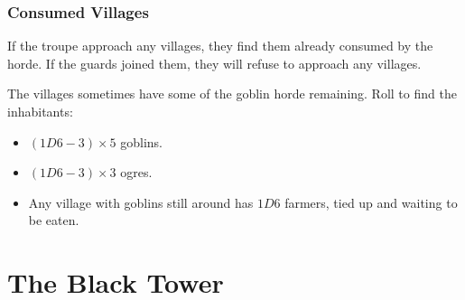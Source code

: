 \begin{multicols}{2}
\subsubsection{Consumed Villages}

If the troupe approach any villages, they find them already consumed by the horde.
If the \glspl{guard} joined them, they will refuse to approach any villages.

The villages sometimes have some of the goblin horde remaining.
Roll to find the inhabitants:


\begin{itemize}
  \item
  $(1D6 - 3)\times 5$ goblins.
  \item
  $(1D6 - 3)\times 3$ ogres.
  \item
  Any village with goblins still around has $1D6$ farmers, tied up and waiting to be eaten.
\end{itemize}

\end{multicols}

\section{The Black Tower}


